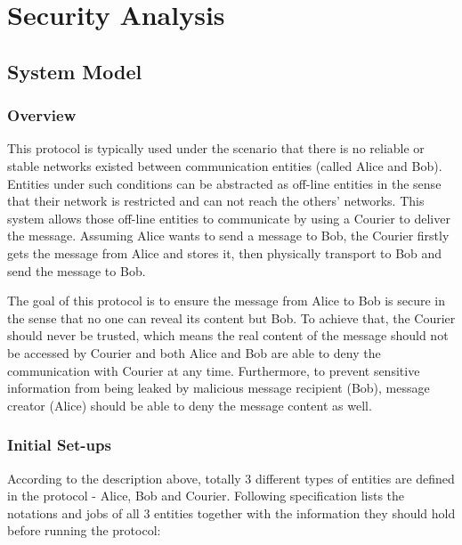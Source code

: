\section*{Security Analysis}
\subsection*{System Model}
\subsubsection*{Overview}
This protocol is typically used under the scenario that there is no reliable or stable networks existed between communication entities (called Alice and Bob). Entities under such conditions can be abstracted as off-line entities in the sense that their network is restricted and can not reach the others' networks. This system allows those off-line entities to communicate by using a Courier to deliver the message. Assuming Alice wants to send a message to Bob, the Courier firstly gets the message from Alice and stores it, then physically transport to Bob and send the message to Bob. \par
The goal of this protocol is to ensure the message from Alice to Bob is secure in the sense that no one can reveal its content but Bob. To achieve that, the Courier should never be trusted, which means the real content of the message should not be accessed by Courier and both Alice and Bob are able to deny the communication with Courier at any time. Furthermore, to prevent sensitive information from being leaked by malicious message recipient (Bob), message creator (Alice) should be able to deny the message content as well.

\subsubsection*{Initial Set-ups}
According to the description above, totally 3 different types of entities are defined in the protocol - Alice, Bob and Courier. Following specification lists the notations and jobs of all 3 entities together with the information they should hold before running the protocol:

